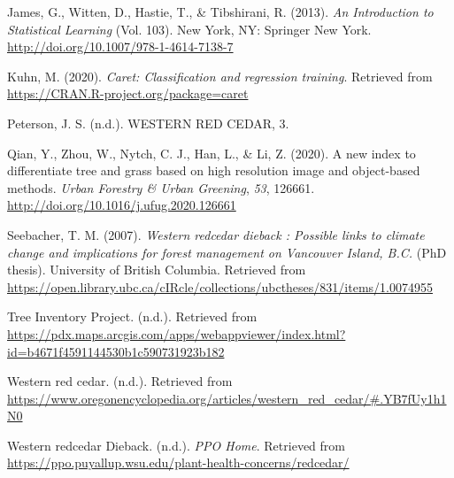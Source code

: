 \documentclass[12pt,twoside]{reedthesis}
\begin{document}
\leavevmode\hypertarget{ref-james_introduction_2013}{}%
James, G., Witten, D., Hastie, T., \& Tibshirani, R. (2013). \emph{An Introduction to Statistical Learning} (Vol. 103). New York, NY: Springer New York. \url{http://doi.org/10.1007/978-1-4614-7138-7}

\leavevmode\hypertarget{ref-caret}{}%
Kuhn, M. (2020). \emph{Caret: Classification and regression training}. Retrieved from \url{https://CRAN.R-project.org/package=caret}

\leavevmode\hypertarget{ref-peterson_western_nodate}{}%
Peterson, J. S. (n.d.). WESTERN RED CEDAR, 3.

\leavevmode\hypertarget{ref-qian_new_2020}{}%
Qian, Y., Zhou, W., Nytch, C. J., Han, L., \& Li, Z. (2020). A new index to differentiate tree and grass based on high resolution image and object-based methods. \emph{Urban Forestry \& Urban Greening}, \emph{53}, 126661. \url{http://doi.org/10.1016/j.ufug.2020.126661}

\leavevmode\hypertarget{ref-seebacher_western_2007}{}%
Seebacher, T. M. (2007). \emph{Western redcedar dieback : Possible links to climate change and implications for forest management on Vancouver Island, B.C.} (PhD thesis). University of British Columbia. Retrieved from \url{https://open.library.ubc.ca/cIRcle/collections/ubctheses/831/items/1.0074955}

\leavevmode\hypertarget{ref-noauthor_tree_nodate}{}%
Tree Inventory Project. (n.d.). Retrieved from \url{https://pdx.maps.arcgis.com/apps/webappviewer/index.html?id=b4671f4591144530b1c590731923b182}

\leavevmode\hypertarget{ref-noauthor_western_nodate-1}{}%
Western red cedar. (n.d.). Retrieved from \url{https://www.oregonencyclopedia.org/articles/western_red_cedar/\#.YB7fUy1h1N0}

\leavevmode\hypertarget{ref-noauthor_western_nodate}{}%
Western redcedar Dieback. (n.d.). \emph{PPO Home}. Retrieved from \url{https://ppo.puyallup.wsu.edu/plant-health-concerns/redcedar/}


\end{document}
